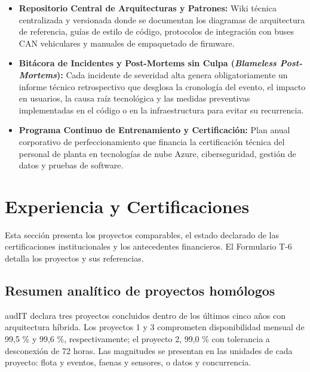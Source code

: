 \begin{itemize}
  \item \textbf{Repositorio Central de Arquitecturas y Patrones:} Wiki técnica centralizada y versionada donde se documentan los diagramas de arquitectura de referencia, guías de estilo de código, protocolos de integración con buses CAN vehiculares y manuales de empaquetado de firmware.
  \item \textbf{Bitácora de Incidentes y Post-Mortems sin Culpa (\textit{Blameless Post-Mortems}):} Cada incidente de severidad alta genera obligatoriamente un informe técnico retrospectivo que desglosa la cronología del evento, el impacto en usuarios, la causa raíz tecnológica y las medidas preventivas implementadas en el código o en la infraestructura para evitar su recurrencia.
  \item \textbf{Programa Continuo de Entrenamiento y Certificación:} Plan anual corporativo de perfeccionamiento que financia la certificación técnica del personal de planta en tecnologías de nube Azure, ciberseguridad, gestión de datos y pruebas de software.
\end{itemize}

\section{Experiencia y Certificaciones}\label{sec:1-experiencia}

Esta sección presenta los proyectos comparables, el estado declarado de las certificaciones institucionales y los antecedentes financieros. El Formulario T-6 detalla los proyectos y sus referencias.

\subsection{Resumen analítico de proyectos homólogos}\label{sec:1-proyectos-homologos}

audIT declara tres proyectos concluidos dentro de los últimos cinco años con arquitectura híbrida. Los proyectos 1 y 3 comprometen disponibilidad mensual de 99,5 \% y 99,6 \%, respectivamente; el proyecto 2, 99,0 \% con tolerancia a desconexión de 72 horas. Las magnitudes se presentan en las unidades de cada proyecto: flota y eventos, faenas y sensores, o datos y concurrencia.

